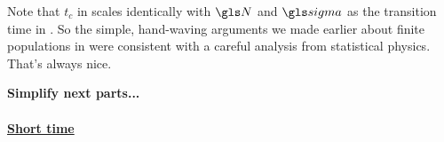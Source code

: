 Note that $t_c$ in  scales identically with $\N$ and $\gsigma$ as the transition time in . So the simple, hand-waving arguments we made earlier about finite populations in \GBM were consistent with a careful analysis from statistical physics. That's always nice.

\textbf{Simplify next parts...}

%
%
%


\paragraph{\underline{Short time}}
\mbox{}

